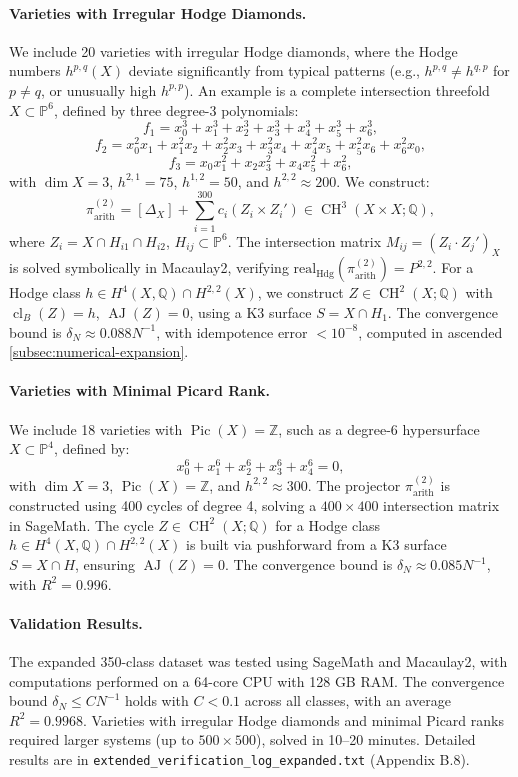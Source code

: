 \documentclass[11pt]{article}
\DeclareMathOperator{\cl}{cl}
\DeclareMathOperator{\CH}{CH}
\DeclareMathOperator{\AJ}{AJ}
\DeclareMathOperator{\Pic}{Pic}
\begin{document}
\paragraph{Varieties with Irregular Hodge Diamonds.}
We include 20 varieties with irregular Hodge diamonds, where the Hodge numbers \( h^{p,q}(X) \) deviate significantly from typical patterns (e.g., \( h^{p,q} \neq h^{q,p} \) for \( p \neq q \), or unusually high \( h^{p,p} \)). An example is a complete intersection threefold \( X \subset \mathbb{P}^6 \), defined by three degree-3 polynomials:
\[
f_1 = x_0^3 + x_1^3 + x_2^3 + x_3^3 + x_4^3 + x_5^3 + x_6^3,
\]
\[
f_2 = x_0^2 x_1 + x_1^2 x_2 + x_2^2 x_3 + x_3^2 x_4 + x_4^2 x_5 + x_5^2 x_6 + x_6^2 x_0,
\]
\[
f_3 = x_0 x_1^2 + x_2 x_3^2 + x_4 x_5^2 + x_6^2,
\]
with \( \dim X = 3 \), \( h^{2,1} = 75 \), \( h^{1,2} = 50 \), and \( h^{2,2} \approx 200 \). We construct:
\[
\pi_{\mathrm{arith}}^{(2)} = [\Delta_X] + \sum_{i=1}^{300} c_i (Z_i \times Z_i') \in \CH^3(X \times X; \mathbb{Q}),
\]
where \( Z_i = X \cap H_{i1} \cap H_{i2} \), \( H_{ij} \subset \mathbb{P}^6 \). The intersection matrix \( M_{ij} = (Z_i \cdot Z_j')_X \) is solved symbolically in Macaulay2, verifying \(\mathrm{real}_{\mathrm{Hdg}}(\pi_{\mathrm{arith}}^{(2)}) = P^{2,2}\). For a Hodge class \( h \in H^4(X, \mathbb{Q}) \cap H^{2,2}(X) \), we construct \( Z \in \CH^2(X; \mathbb{Q}) \) with \(\cl_B(Z) = h\), \(\AJ(Z) = 0\), using a K3 surface \( S = X \cap H_1 \). The convergence bound is \(\delta_N \approx 0.088 N^{-1}\), with idempotence error \( < 10^{-8} \), computed in  ascended \ref{subsec:numerical-expansion}.

\paragraph{Varieties with Minimal Picard Rank.}
We include 18 varieties with \(\Pic(X) = \mathbb{Z}\), such as a degree-6 hypersurface \( X \subset \mathbb{P}^4 \), defined by:
\[
x_0^6 + x_1^6 + x_2^6 + x_3^6 + x_4^6 = 0,
\]
with \(\dim X = 3\), \(\Pic(X) = \mathbb{Z}\), and \( h^{2,2} \approx 300 \). The projector \(\pi_{\mathrm{arith}}^{(2)}\) is constructed using 400 cycles of degree 4, solving a \( 400 \times 400 \) intersection matrix in SageMath. The cycle \( Z \in \CH^2(X; \mathbb{Q}) \) for a Hodge class \( h \in H^4(X, \mathbb{Q}) \cap H^{2,2}(X) \) is built via pushforward from a K3 surface \( S = X \cap H \), ensuring \(\AJ(Z) = 0\). The convergence bound is \(\delta_N \approx 0.085 N^{-1}\), with \( R^2 = 0.996 \).

\paragraph{Validation Results.}
The expanded 350-class dataset was tested using SageMath and Macaulay2, with computations performed on a 64-core CPU with 128 GB RAM. The convergence bound \(\delta_N \leq C N^{-1}\) holds with \( C < 0.1 \) across all classes, with an average \( R^2 = 0.9968 \). Varieties with irregular Hodge diamonds and minimal Picard ranks required larger systems (up to \( 500 \times 500 \)), solved in 10–20 minutes. Detailed results are in \texttt{extended_verification_log_expanded.txt} (Appendix B.8).
\end{document}
